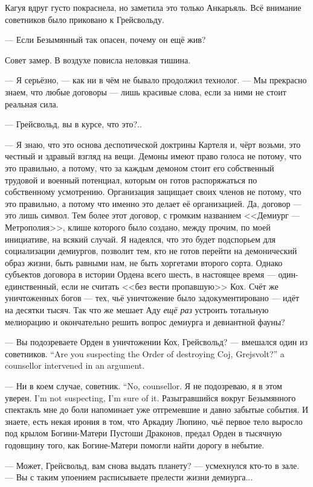 Кагуя вдруг густо покраснела, но заметила это только Анкарьяль.
Всё внимание советников было приковано к Грейсвольду.

--- Если Безымянный так опасен, почему он ещё жив?

Совет замер.
В воздухе повисла неловкая тишина.

--- Я серьёзно, --- как ни в чём не бывало продолжил технолог.
--- Мы прекрасно знаем, что любые договоры --- лишь красивые слова, если за ними не стоит реальная сила.

--- Грейсвольд, вы в курсе, что это?..

--- Я знаю, что это основа деспотической доктрины Картеля и, чёрт возьми, это честный и здравый взгляд на вещи.
Демоны имеют право голоса не потому, что это правильно, а потому, что за каждым демоном стоит его собственный трудовой и военный потенциал, которым он готов распоряжаться по собственному усмотрению.
Организация защищает своих членов не потому, что это правильно, а потому что именно это делает её организацией.
Да, договор --- это лишь символ.
Тем более этот договор, с громким названием <<Демиург --- Метрополия>>, клише которого было создано, между прочим, по моей инициативе, на всякий случай.
Я надеялся, что это будет подспорьем для социализации демиургов, позволит тем, кто не готов перейти на демонический образ жизни, быть равными нам, не быть хоргетами второго сорта.
Однако субъектов договора в истории Ордена всего шесть, в настоящее время --- один-единственный, если не считать <<без вести пропавшую>> Кох.
Счёт же уничтоженных богов --- тех, чьё уничтожение было задокументировано --- идёт на десятки тысяч.
Так что же мешает Аду \emph{ещё раз} устроить тотальную мелиорацию и окончательно решить вопрос демиурга и девиантной фауны?

{--- Вы подозреваете Орден в уничтожении Кох, Грейсвольд? --- вмешался один из советников.}
{``Are you suspecting the Order of destroying Coj, Grejsvolt?'' a counsellor intervened in an argument.}

{--- Ни в коем случае, советник.}
{``No, counsellor.}
{Я не подозреваю, я в этом уверен.}
{I'm not suspecting, I'm sure of it.}
Разыгравшийся вокруг Безымянного спектакль мне до боли напоминает уже отгремевшие и давно забытые события.
И знаете, есть некая ирония в том, что Аркадиу Люпино, чьё первое тело выросло под крылом Богини-Матери Пустоши Драконов, предал Орден в тысячную годовщину того, как Богине-Матери помогли найти дорогу в небытие.

--- Может, Грейсвольд, вам снова выдать планету? --- усмехнулся кто-то в зале.
--- Вы с таким упоением расписываете прелести жизни демиурга...

